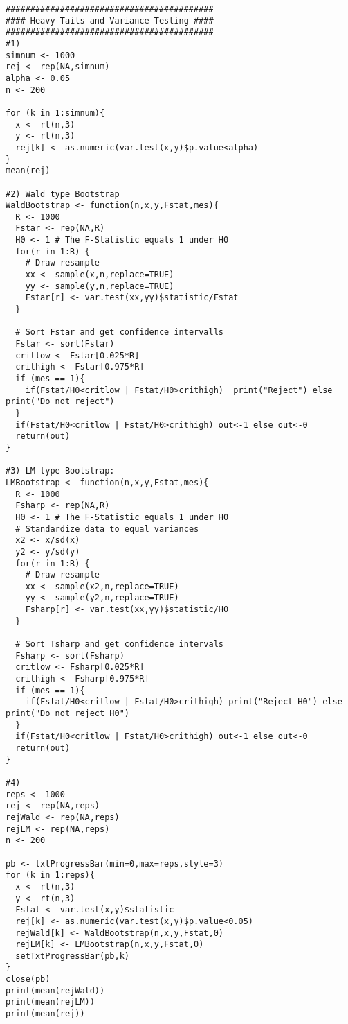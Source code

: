 \documentclass{article}
\begin{document}
\begin{solution}
\begin{verbatim}
##########################################
#### Heavy Tails and Variance Testing ####
##########################################
#1)
simnum <- 1000
rej <- rep(NA,simnum)
alpha <- 0.05
n <- 200

for (k in 1:simnum){
  x <- rt(n,3)
  y <- rt(n,3)
  rej[k] <- as.numeric(var.test(x,y)$p.value<alpha)
}
mean(rej)

#2) Wald type Bootstrap
WaldBootstrap <- function(n,x,y,Fstat,mes){
  R <- 1000
  Fstar <- rep(NA,R)
  H0 <- 1 # The F-Statistic equals 1 under H0
  for(r in 1:R) {
    # Draw resample
    xx <- sample(x,n,replace=TRUE)
    yy <- sample(y,n,replace=TRUE)
    Fstar[r] <- var.test(xx,yy)$statistic/Fstat
  }

  # Sort Fstar and get confidence intervalls
  Fstar <- sort(Fstar)
  critlow <- Fstar[0.025*R]
  crithigh <- Fstar[0.975*R]
  if (mes == 1){
    if(Fstat/H0<critlow | Fstat/H0>crithigh)  print("Reject") else print("Do not reject")
  }
  if(Fstat/H0<critlow | Fstat/H0>crithigh) out<-1 else out<-0
  return(out)
}

#3) LM type Bootstrap:
LMBootstrap <- function(n,x,y,Fstat,mes){
  R <- 1000
  Fsharp <- rep(NA,R)
  H0 <- 1 # The F-Statistic equals 1 under H0
  # Standardize data to equal variances
  x2 <- x/sd(x)
  y2 <- y/sd(y)
  for(r in 1:R) {
    # Draw resample
    xx <- sample(x2,n,replace=TRUE)
    yy <- sample(y2,n,replace=TRUE)
    Fsharp[r] <- var.test(xx,yy)$statistic/H0
  }

  # Sort Tsharp and get confidence intervals
  Fsharp <- sort(Fsharp)
  critlow <- Fsharp[0.025*R]
  crithigh <- Fsharp[0.975*R]
  if (mes == 1){
    if(Fstat/H0<critlow | Fstat/H0>crithigh) print("Reject H0") else print("Do not reject H0")
  }
  if(Fstat/H0<critlow | Fstat/H0>crithigh) out<-1 else out<-0
  return(out)
}

#4)
reps <- 1000
rej <- rep(NA,reps)
rejWald <- rep(NA,reps)
rejLM <- rep(NA,reps)
n <- 200

pb <- txtProgressBar(min=0,max=reps,style=3)
for (k in 1:reps){
  x <- rt(n,3)
  y <- rt(n,3)
  Fstat <- var.test(x,y)$statistic
  rej[k] <- as.numeric(var.test(x,y)$p.value<0.05)
  rejWald[k] <- WaldBootstrap(n,x,y,Fstat,0)
  rejLM[k] <- LMBootstrap(n,x,y,Fstat,0)
  setTxtProgressBar(pb,k)
}
close(pb)
print(mean(rejWald))
print(mean(rejLM))
print(mean(rej))
\end{verbatim}
\end{solution}
\end{document}
